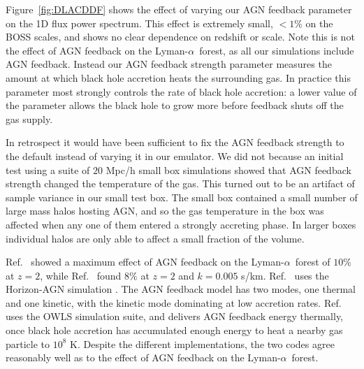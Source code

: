 \documentclass[a4paper,11pt]{article}
\newcommand{\Lya}{Lyman-$\alpha$}
\begin{document}
Figure~\ref{fig:DLACDDF} shows the effect of varying our AGN feedback parameter on the 1D flux power spectrum. This effect is extremely small, $<1\%$ on the BOSS scales, and shows no clear dependence on redshift or scale. Note this is not the effect of AGN feedback on the \Lya~forest, as all our simulations include AGN feedback. Instead our AGN feedback strength parameter measures the amount at which black hole accretion heats the surrounding gas. In practice this parameter most strongly controls the rate of black hole accretion: a lower value of the parameter allows the black hole to grow more before feedback shuts off the gas supply.

In retrospect it would have been sufficient to fix the AGN feedback strength to the default instead of varying it in our emulator. We did not because an initial test using a suite of $20$ Mpc/h small box simulations showed that AGN feedback strength changed the temperature of the gas. This turned out to be an artifact of sample variance in our small test box. The small box contained a small number of large mass halos hosting AGN, and so the gas temperature in the box was affected when any one of them entered a strongly accreting phase. In larger boxes individual halos are only able to affect a small fraction of the volume.


Ref.~\cite{Viel:2013} showed a maximum effect of AGN feedback on the \Lya~forest of $10\%$ at $z=2$, while Ref.~\cite{Chabanier:2020} found $8\%$ at $z=2$ and $k = 0.005$ s/km. Ref.~\cite{Chabanier:2020} uses the Horizon-AGN simulation \cite{Dubois:2016}. The AGN feedback model has two modes, one thermal and one kinetic, with the kinetic mode dominating at low accretion rates. Ref.~\cite{Viel:2013} uses the OWLS simulation suite, and delivers AGN feedback energy thermally, once black hole accretion has accumulated enough energy to heat a nearby gas particle to $10^8$ K. Despite the different implementations, the two codes agree reasonably well as to the effect of AGN feedback on the \Lya~forest.

\end{document}
